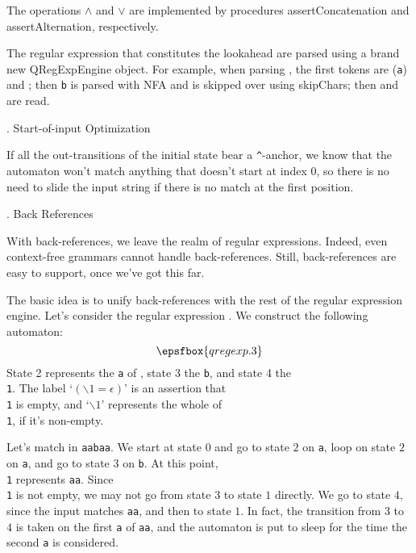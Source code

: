 The operations $\land$ and $\lor$ are implemented by procedures {\sf assertConcatenation} and {\sf assertAlternation}, respectively.

The regular expression that constitutes the lookahead are parsed using a brand new {\sf QRegExpEngine} object.  For example, when parsing , the first tokens are  ({\tt a}) and ; then {\tt b} is parsed with NFA and is skipped over using {\sf skipChars}; then \lex{)} and  are read.

. Start-of-input Optimization

If all the out-transitions of the initial state bear a {\tt\^}-anchor, we know that the automaton won't match anything that doesn't start at index 0, so there is no need to slide the input string if there is no match at the first position.

. Back References

With back-references, we leave the realm of regular expressions.  Indeed, even context-free grammars cannot handle back-references.  Still, back-references are easy to support, once we've got this far.

The basic idea is to unify back-references with the rest of the regular expression engine.  Let's consider the regular expression .  We construct the following automaton:  $$\epsfbox{qregexp.3}$$  State 2 represents the {\tt a} of , state 3 the {\tt b}, and state 4 the {\tt \\1}.  The label `$(\backslash1 = \epsilon)$' is an assertion that {\tt \\1} is empty, and `$\backslash1$' represents the whole of {\tt \\1}, if it's non-empty.

Let's match  in {\tt aabaa}.  We start at state $0$ and go to state $2$ on {\tt a}, loop on state $2$ on {\tt a}, and go to state $3$ on {\tt b}.  At this point, {\tt \\1} represents {\tt aa}.  Since {\tt \\1} is not empty, we may not go from state $3$ to state $1$ directly.  We go to state $4$, since the input matches {\tt aa}, and then to state $1$.  In fact, the transition from $3$ to $4$ is taken on the first {\tt a} of {\tt aa}, and the automaton is put to sleep for the time the second {\tt a} is considered.

